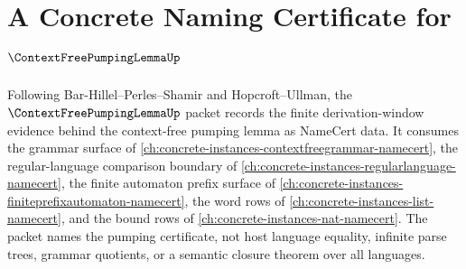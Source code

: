 \chapter{A Concrete Naming Certificate for $\ContextFreePumpingLemmaUp$}
\label{ch:concrete-instances-context-free-pumping-lemma-namecert}

Following Bar-Hillel--Perles--Shamir and Hopcroft--Ullman, the $\ContextFreePumpingLemmaUp$ packet records the finite derivation-window evidence behind the context-free pumping lemma as NameCert data. It consumes the grammar surface of \autoref{ch:concrete-instances-contextfreegrammar-namecert}, the regular-language comparison boundary of \autoref{ch:concrete-instances-regularlanguage-namecert}, the finite automaton prefix surface of \autoref{ch:concrete-instances-finiteprefixautomaton-namecert}, the word rows of \autoref{ch:concrete-instances-list-namecert}, and the bound rows of \autoref{ch:concrete-instances-nat-namecert}. The packet names the pumping certificate, not host language equality, infinite parse trees, grammar quotients, or a semantic closure theorem over all languages.

